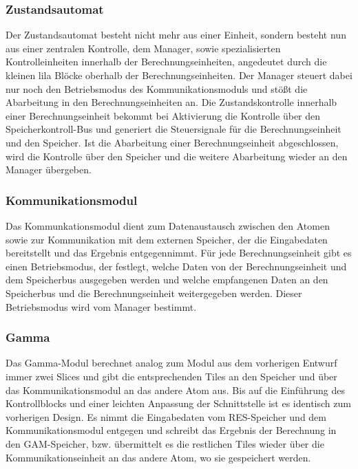 \subsubsection{Zustandsautomat}
Der Zustandsautomat besteht nicht mehr aus einer Einheit, sondern besteht nun aus einer zentralen Kontrolle, dem Manager,
sowie spezialisierten Kontrolleinheiten innerhalb der Berechnungseinheiten, angedeutet durch die kleinen lila Blöcke oberhalb der Berechnungseinheiten.
Der Manager steuert dabei nur noch den Betriebsmodus des Kommunikationsmoduls und stößt die Abarbeitung in den Berechnungseinheiten an.
Die Zustandskontrolle innerhalb einer Berechnungseinheit bekommt bei Aktivierung die Kontrolle über den Speicherkontroll-Bus
und generiert die Steuersignale für die Berechnungseinheit und den Speicher. Ist die Abarbeitung einer Berechnungseinheit abgeschlossen,
wird die Kontrolle über den Speicher und die weitere Abarbeitung wieder an den Manager übergeben.

\subsubsection{Kommunikationsmodul}
Das Kommunkationsmodul dient zum Datenaustausch zwischen den Atomen sowie zur Kommunikation mit dem externen Speicher, der die Eingabedaten bereitstellt und das Ergebnis entgegennimmt.
Für jede Berechnungseinheit gibt es einen Betriebsmodus, der festlegt, welche Daten von der Berechnungseinheit und dem Speicherbus ausgegeben werden und welche empfangenen Daten
an den Speicherbus und die Berechnungseinheit weitergegeben werden. Dieser Betriebsmodus wird vom Manager bestimmt.

\subsubsection{Gamma}
Das Gamma-Modul berechnet analog zum Modul aus dem vorherigen Entwurf immer zwei Slices und gibt die entsprechenden Tiles
an den Speicher und über das Kommunikationsmodul an das andere Atom aus. Bis auf die Einführung des Kontrollblocks
und einer leichten Anpassung der Schnittstelle ist es identisch zum vorherigen Design.
Es nimmt die Eingabedaten vom RES-Speicher und dem Kommunikationsmodul entgegen und schreibt das Ergebnis der Berechnung in den GAM-Speicher,
bzw. übermittelt es die restlichen Tiles wieder über die Kommunikationseinheit an das andere Atom, wo sie gespeichert werden.

